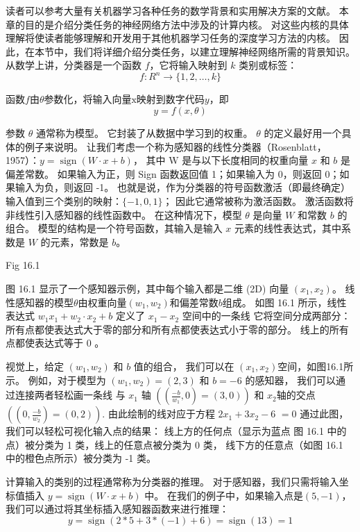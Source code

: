 读者可以参考大量有关机器学习各种任务的数学背景和实用解决方案的文献。 
本章的目的是介绍分类任务的神经网络方法中涉及的计算内核。 
对这些内核的具体理解将使读者能够理解和开发用于其他机器学习任务的深度学习方法的内核。 
因此，在本节中，我们将详细介绍分类任务，以建立理解神经网络所需的背景知识。 
从数学上讲，分类器是一个函数 $f$，它将输入映射到 $k$ 类别或标签：
$$
f: R^{n} \rightarrow\{1,2, \ldots, k\}
$$

函数$f$由$\theta$参数化，将输入向量$\mathrm{x}$映射到数字代码$y$，即
$$
y=f(x, \theta)
$$

参数 $\theta$ 通常称为模型。 它封装了从数据中学习到的权重。 $\theta$ 的定义最好用一个具体的例子来说明。 
让我们考虑一个称为感知器的线性分类器（Rosenblatt，1957）：$y=\operatorname{sign}(W \cdot x+b)$，
其中 $\mathrm{W}$ 是与以下长度相同的权重向量 $x$ 和 $b$ 是偏差常数。 
如果输入为正，则 Sign 函数返回值 1；如果输入为 0，则返回 0；如果输入为负，则返回 -1。 
也就是说，作为分类器的符号函数激活（即最终确定）输入值到三个类别的映射：$\{-1,0,1\}$； 因此它通常被称为激活函数。 
激活函数将非线性引入感知器的线性函数中。 在这种情况下，模型 $\theta$ 是向量 $W$ 和常数 $b$ 的组合。 
模型的结构是一个符号函数，其输入是输入 $x$ 元素的线性表达式，其中系数是 $W$ 的元素，常数是 $b$。

{\color{red} Fig 16.1}

图 16.1 显示了一个感知器示例，其中每个输入都是二维 (2D) 向量 $\left(x_{1}, x_{2}\right)$。 
线性感知器的模型$\theta$由权重向量$\left(w_{1}, w_{2}\right)$和偏差常数$b$组成。 
如图 16.1 所示，线性表达式 $w_{1} x_{1}+w_{2} \cdot x_{2}+b$ 
定义了 $x_{1}-x_{2}$ 空间中的一条线 它将空间分成两部分：所有点都使表达式大于零的部分和所有点都使表达式小于零的部分。 
线上的所有点都使表达式等于 0 。

视觉上，给定 $\left(w_{1}, w_{2}\right)$ 和 $b$ 值的组合，
我们可以在 $\left(x_{1}, x_{2}\right)$空间，如图16.1所示。 
例如，对于模型为 $\left(w_{1}, w_{2}\right)=(2,3)$ 和 $b=-6$ 的感知器，
我们可以通过连接两者轻松画一条线 与 $x_{1}$ 轴 $\left(\left(\frac{-b}{w_{1}}, 0\right)=(3,0)\right)$ 
和 $x_{2}$轴的交点$\left(\left(0, \frac{-b}{w_{2}}\right)=(0,2)\right)$. 
由此绘制的线对应于方程 $2 x_{1}+3 x_{2}-6$ $=0$ 通过此图，我们可以轻松可视化输入点的结果： 
线上方的任何点（显示为蓝点 图 16.1 中的点）被分类为 1 类，线上的任意点被分类为 0 类，
线下方的任意点（如图 16.1 中的橙色点所示）被分类为 -1 类。

计算输入的类别的过程通常称为分类器的推理。 
对于感知器，我们只需将输入坐标值插入 $y=\operatorname{sign}(W \cdot x+b)$ 中。 
在我们的例子中，如果输入点是$(5,-1)$，我们可以通过将其坐标插入感知器函数来进行推理：
$$
y=\operatorname{sign}(2 * 5+3 *(-1)+6)=\operatorname{sign}(13)=1
$$


